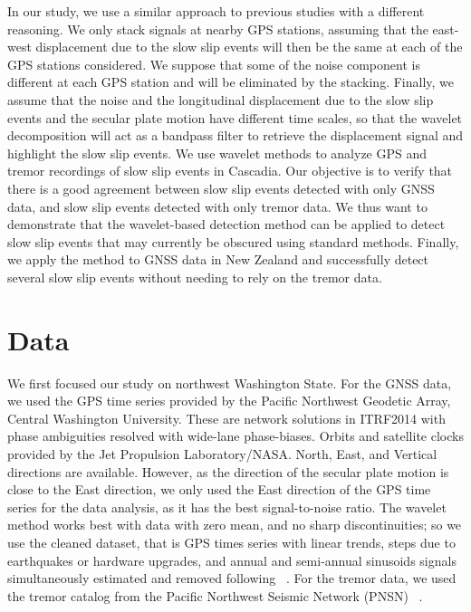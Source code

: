 \documentclass{article}
\begin{document}
In our study, we use a similar approach to previous studies with a different reasoning. We only stack signals at nearby GPS stations, assuming that the east-west displacement due to the slow slip events will then be the same at each of the GPS stations considered. We suppose that some of the noise component is different at each GPS station and will be eliminated by the stacking. Finally, we assume that the noise and the longitudinal displacement due to the slow slip events and the secular plate motion have different time scales, so that the wavelet decomposition will act as a bandpass filter to retrieve the displacement signal and highlight the slow slip events. We use wavelet methods to analyze GPS and tremor recordings of slow slip events in Cascadia. Our objective is to verify that there is a good agreement between slow slip events detected with only GNSS data, and slow slip events detected with only tremor data. We thus want to demonstrate that the wavelet-based detection method can be applied to detect slow slip events that may currently be obscured using standard methods. Finally, we apply the method to GNSS data in New Zealand and successfully detect several slow slip events without needing to rely on the tremor data. \\

\section{Data}

We first focused our study on northwest Washington State. For the GNSS data, we used the GPS time series provided by the Pacific Northwest Geodetic Array, Central Washington University. These are network solutions in ITRF2014 with phase ambiguities resolved with wide-lane phase-biases. Orbits and satellite clocks provided by the Jet Propulsion Laboratory/NASA. North, East, and Vertical directions are available. However, as the direction of the secular plate motion is close to the East direction, we only used the East direction of the GPS time series for the data analysis, as it has the best signal-to-noise ratio. The wavelet method works best with data with zero mean, and no sharp discontinuities; so we use the cleaned dataset, that is GPS times series with linear trends, steps due to earthquakes or hardware upgrades, and annual and semi-annual sinusoids signals simultaneously estimated and removed following ~\citet{SZE_2004}. For the tremor data, we used the tremor catalog from the Pacific Northwest Seismic Network (PNSN) ~\citep{WEC_2010}. \\
\end{document}
